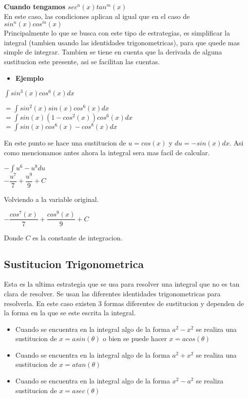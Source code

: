 \documentclass[12pt]{article}
\begin{document}
\textbf{Cuando tengamos  $sec^n(x) tan^m(x)$}\\
En este caso, las condiciones aplican al igual que en el caso de $sin^n(x) cos^m (x)$\\

Principalmente lo que se busca con este tipo de estrategias, es simplificar la integral (tambien usando las identidades trigonometricas), para que quede mas simple de integrar. Tambien se tiene en cuenta que la derivada de alguna sustitucion este presente, asi se facilitan las cuentas.\\

\begin{itemize}
 \item \textbf{Ejemplo}
\end{itemize}

$ \int sin^3(x) cos^6(x) dx$ 
\begin{center}
$=\int sin^2(x) sin(x) cos^6(x) dx$\\  

$=\int sin(x) (1-cos^2(x)) cos^6(x) dx $ \\

$=\int sin(x) cos^6(x) - cos^8(x) dx$\\
\end{center}
En este punto se hace una sustitucion de $u = cos(x)$ y $du = -sin(x) dx$. Asi como mencionamos antes ahora la integral sera mas facil de calcular.

\begin{center}
$-\int u^6 - u^8 du$ \\ $-\dfrac{u^7}{7} + \dfrac {u^9}{9} + C $
\end{center}
Volviendo a la variable original.
\begin{center}
 $- \dfrac {cos^7 (x)}{7} + \dfrac {cos^9 (x)}{9} + C$
\end{center}
Donde $C$ es la constante de integracion.

\subsection{Sustitucion Trigonometrica}
Esta es la ultima estrategia que se usa para resolver una integral que no es tan clara de resolver. Se usan las diferentes identidades trigonometricas para resolverla.
En este caso existen 3 formas diferentes de sustitucion y dependen de la forma en la que se este escrita la integral.
\begin{itemize}
 \item Cuando se encuentra en la integral algo de la forma $a^2 - x^2$ se realiza una sustitucion  de $x=a sin(\theta)$ o bien se puede hacer $x= acos(\theta)$
 \item Cuando se encuentra en la integral algo de la forma $a^2+x^2$ se realiza una sustitucion de $x=a tan(\theta)$
 \item Cuando se encuentra en la integral algo de la forma $x^2 - a^2$ se realiza sustitucion de $x= a sec(\theta)$
\end{itemize}
\end{document}

